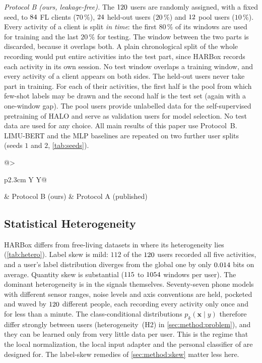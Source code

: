 \emph{Protocol B (ours, leakage-free).} The $120$ users are randomly assigned, with a fixed
seed, to $84$ FL clients ($70\,\%$), $24$ held-out users ($20\,\%$) and $12$
pool users ($10\,\%$). Every activity of a client is split \emph{in time}: the first $80\,\%$ of its
windows are used for training and the last $20\,\%$ for testing. The window between the two
parts is discarded, because it overlaps both. A plain chronological split of the whole recording
would put entire activities into the test part, since HARBox records each activity in its own
session. No test window overlaps a training window, and every activity of a client appears on
both sides. The held-out users never take part in training. For each of their activities, the
first half is the pool from which few-shot labels may be drawn and the second half is the test
set (again with a one-window gap). The pool users provide unlabelled data for the
self-supervised pretraining of HALO and serve as validation users for model selection. No test
data are used for any choice. All main results of this paper use Protocol~B. LIMU-BERT and the MLP
baselines are repeated on two further user splits (seeds $1$ and $2$, \cref{tab:seeds}).

\begin{table}[!t]
\centering
\caption{The two evaluation protocols on HARBox (seed $0$). $^{\dagger}$Pool users' windows (validation).}
\label{tab:partition}
\footnotesize
\setlength{\tabcolsep}{3pt}
\renewcommand{\arraystretch}{1.12}
\begin{tabularx}{\columnwidth}{@{}>{\raggedright\arraybackslash}p{2.3cm} Y Y@{}}
\toprule
 & Protocol B (ours) & Protocol A (published) \\
\midrule
{}
\bottomrule
\end{tabularx}
\end{table}

\subsection{Statistical Heterogeneity}\label{sec:data:hetero}

HARBox differs from free-living datasets in where its heterogeneity lies (\cref{tab:hetero}).
Label skew is mild: $112$ of the $120$ users recorded all five activities, and a user's
label distribution diverges from the global one by only $0.014$ bits on average. Quantity skew is
substantial ($115$ to $1054$ windows per user). The dominant heterogeneity is in
the signals themselves. Seventy-seven phone models with different sensor ranges, noise levels and
axis conventions are held, pocketed and waved by $120$ different people, each recording every
activity only once and for less than a minute. The class-conditional distributions
$p_k(\mathbf{x}\mid y)$ therefore differ strongly between users (heterogeneity~(H2) in
\cref{sec:method:problem}), and they can be learned only from very little data per user. This is
the regime that the local normalization, the local input adapter and the personal classifier of
\method{} are designed for. The label-skew remedies of \cref{sec:method:skew} matter less here.

